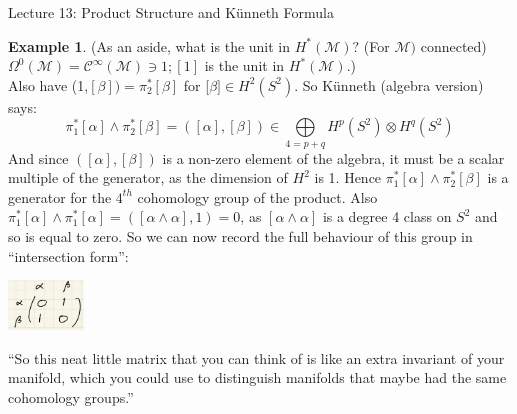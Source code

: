 \documentclass[10pt]{article}
\theoremstyle{plain}
\theoremstyle{definition}
\newtheorem{exmp}[thm]{Example} %
\newcommand{\man}{\mathcal{M}}
\newcommand{\pformman}[1]{\Omega^{#1}(\man)}
\newcommand{\cts}[1]{\mathcal{C}^{\infty}(#1)}
\newcommand{\cohomman}[1]{H^{#1}(\man)}
\newcommand{\cohom}[2]{H^{#1}(#2)}
\begin{document}
\begin{section}{Lecture 13: Product Structure and K\"unneth Formula}
\begin{exmp}
(As an aside, what is the unit in $H^*(\man)?$ (For $\man)$ connected) $\pformman{0} = \cts{\man} \ni 1 ; [1]$ is the unit in $\cohomman{*}$.)\\
Also have (1,$[\beta]) = \pi_2^*[\beta]$ for [$\beta ] \in \cohom{2}{S^2}$. So K\"unneth (algebra version) says:
$$\pi_1^*[\alpha] \wedge \pi_2^* [\beta] = ([\alpha],[\beta])\in \bigoplus\limits_{4=p+q} \cohom{p}{S^2} \otimes \cohom{q}{S^2}$$
And since $([\alpha],[\beta]) $ is a non-zero element of the algebra, it must be a scalar multiple of the generator, as the dimension of $H^2$ is 1. Hence $\pi_1^*[\alpha] \wedge \pi_2^* [\beta]$ is a generator for the $4^{th}$ cohomology group of the product. Also $\pi_1^*[\alpha] \wedge \pi_1^* [\alpha] = ([\alpha \wedge \alpha] ,1) = 0$, as $[\alpha \wedge \alpha]$ is a degree 4 class on $S^2$ and so is equal to zero. So we can now record the full behaviour of this group in ``intersection form'':
\begin{center}\includegraphics[width=0.15\textwidth]{IntersectionFormS2xS2.png}\end{center}
``So this neat little matrix that you can think of is like an extra invariant of your manifold, which you could use to distinguish manifolds that maybe had the same cohomology groups.''
\end{exmp}
\end{section}
\end{document}
